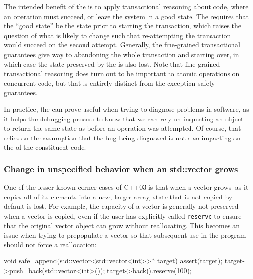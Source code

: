 The intended benefit of the 
is to apply transactional reasoning about code, where an operation must
succeed, or leave the system in a good state. The  requires that the ``good state'' be the state prior to
starting the transaction, which raises the question of what is likely to
change such that re-attempting the transaction would succeed on the
second attempt. Generally, the fine-grained transactional guarantees
give way to abandoning the whole transaction and starting over, in which
case the state preserved by the  is also lost.
Note that fine-grained transactional reasoning does turn out to be
important to atomic operations on concurrent code, but that is entirely
distinct from the exception safety guarantees.

In practice, the  can prove useful when trying
to diagnose problems in software, as it helps the debugging process to
know that we can rely on inspecting an object to return the same state
as before an operation was attempted. Of course, that relies on the
assumption that the bug being diagnosed is not also impacting on the
 of the constituent code.

\subsubsection[Change in unspecified behavior when an \lstinline!std::vector! grows]{Change in unspecified behavior when an {\SubsubsecCode std::vector} grows}\label{change-in-unspecified-behavior-when-an-std::vector-grows}

One of the lesser known corner cases of C++03 is that when a vector
grows, as it copies all of its elements into a new, larger array, state
that is not copied by default is lost. For example, the capacity of a
vector is generally not preserved when a vector is copied, even if the
user has explicitly called \lstinline!reserve! to ensure that the original
vector object can grow without reallocating. This becomes an issue when
trying to prepopulate a vector so that subsequent use in the program
should not force a reallocation:

\begin{emcppslisting}
void safe_append(std::vector<std::vector<int>>* target)
{
    assert(target);
    target->push_back(std::vector<int>());
    target->back().reserve(100);
}
\end{emcppslisting}
    

